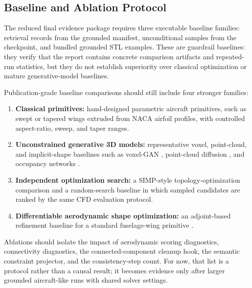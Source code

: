 \subsection{Baseline and Ablation Protocol}
\label{sec:baselines}
The reduced final evidence package requires three executable baseline families: retrieval records from the grounded manifest, unconditional samples from the checkpoint, and bundled grounded STL examples. These are guardrail baselines: they verify that the report contains concrete comparison artifacts and repeated-run statistics, but they do not establish superiority over classical optimization or mature generative-model baselines.

Publication-grade baseline comparisons should still include four stronger families:
\begin{enumerate}
    \item \textbf{Classical primitives:} hand-designed parametric aircraft primitives, such as swept or tapered wings extruded from NACA airfoil profiles, with controlled aspect-ratio, sweep, and taper ranges.
    \item \textbf{Unconstrained generative 3D models:} representative voxel, point-cloud, and implicit-shape baselines such as voxel-GAN \cite{wu20163d}, point-cloud diffusion \cite{luo2021diffusion}, and occupancy networks \cite{mescheder2019occupancy}.
    \item \textbf{Independent optimization search:} a SIMP-style topology-optimization comparison \cite{sigmund2001topology} and a random-search baseline in which sampled candidates are ranked by the same CFD evaluation protocol.
    \item \textbf{Differentiable aerodynamic shape optimization:} an adjoint-based refinement baseline for a standard fuselage-wing primitive \cite{jameson1995optimum}.
\end{enumerate}

Ablations should isolate the impact of aerodynamic scoring diagnostics, connectivity diagnostics, the connected-component cleanup hook, the semantic constraint projector, and the consistency-step count. For now, that list is a protocol rather than a causal result; it becomes evidence only after larger grounded aircraft-like runs with shared solver settings.


